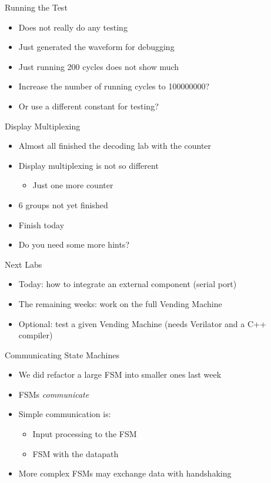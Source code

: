 \begin{frame}[fragile]{Running the Test}
\begin{itemize}
\item Does not really do any testing
\item Just generated the waveform for debugging
\item Just running 200 cycles does not show much
\item Increase the number of running cycles to 100000000?
\item Or use a different constant for testing?
\end{itemize}
\end{frame}


\begin{frame}[fragile]{Display Multiplexing}
\begin{itemize}
\item Almost all finished the decoding lab with the counter
\item Display multiplexing is not so different
\begin{itemize}
\item Just one more counter
\end{itemize}
\item 6 groups not yet finished
\item Finish today
\item Do you need some more hints?
\end{itemize}
\end{frame}


\begin{frame}[fragile]{Next Labs}
\begin{itemize}
\item Today: how to integrate an external component (serial port)
\item The remaining weeks: work on the full Vending Machine
\item Optional: test a given Vending Machine (needs Verilator and a C++ compiler)
\end{itemize}
\end{frame}



\begin{frame}[fragile]{Communicating State Machines}
\begin{itemize}
\item We did refactor a large FSM into smaller ones last week
\item FSMs \emph{communicate}
\item Simple communication is:
\begin{itemize}
\item Input processing to the FSM
\item FSM with the datapath
\end{itemize}
\item More complex FSMs may exchange data with handshaking
\end{itemize}
\end{frame}

